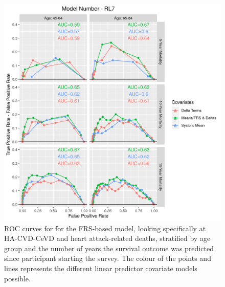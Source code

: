 \documentclass[
]{article}
\begin{document}
\begin{figure}
\hypertarget{fig:ROC_RL7}{%
\centering
\includegraphics{./Rmarkdown_Plots/ROC_CAx-Covariates_EventType_RL7.png}
\caption{ROC curves for for the FRS-based model, looking specifically at HA-CVD-CeVD and heart attack-related deaths, stratified by age group and the number of years the survival outcome was predicted since participant starting the survey. The colour of the points and lines represents the different linear predictor covariate models possible.}\label{fig:ROC_RL7}
}
\end{figure}
\end{document}
